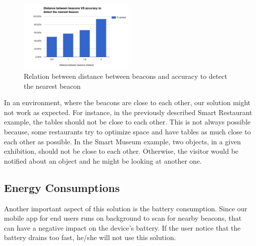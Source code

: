 \begin{figure}[!ht]
  \centering
    \includegraphics[width=0.5\textwidth, keepaspectratio]{figures/results_nearest_beacon}
    \caption[Distance between beacons vs Accuracy]{Relation between distance between beacons and accuracy to detect the nearest beacon}
    \label{fig:results_experiments_nearest_beacon}
\end{figure}

In an environment, where the beacons are close to each other, our solution might not work as expected.
For instance, in the previously described Smart Restaurant example,
the tables should not be close to each other. This is not always possible because, some restaurants try to optimize space and have tables as much close to each other as possible.
In the Smart Museum example, two objects, in a given exhibition, should not be close to each other.
Otherwise, the visitor would be notified about an object and he might be looking at another one.

\subsection{Energy Consumptions}
\label{sub:evaluation_energy_consumptions}
Another important aspect of this solution is the battery consumption.
Since our mobile app for end users runs on background to scan for nearby beacons, that can have a negative impact on the device's battery. If the user notice that the battery drains too fast, he/she will not use this solution.

